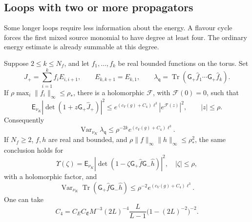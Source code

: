\documentclass[11pt,letterpaper,reqno]{amsart}
\makeatletter
\theoremstyle{definition}
\newcommand{\ms@majorstart}{%
  \pushQED{\qed}\renewcommand{\qedsymbol}{$\blacksquare\square$}}
\newenvironment{theorem}[1][]{\ms@majorstart\ms@theorem[#1]}
  {\popQED\endms@theorem}
\theoremstyle{remark}
\makeatother
\begin{document}
\subsection{Loops with two or more propagators}

Some longer loops require less information about the energy.
A flavour cycle forces the first mixed source monomial to have
degree at least four.  The ordinary energy estimate is already
summable at this degree.

\begin{theorem}\label{C-415-3}
Suppose $2\le k\le N_f$, and let $f_1,\ldots,f_k$ be real bounded
functions on the torus.  Set
\[
 J_+=\sum_{i=1}^k f_iE_{i,i+1},\qquad E_{k,k+1}=E_{k,1},
 \qquad
 \lambda_{\mathsf q}=\operatorname{Tr}
       (\mathsf G_+\hat f_1\cdots\mathsf G_+\hat f_k).
\]
If $\rho\max_i\|f_i\|_\infty\le\rho_*$, there is a holomorphic
$\mathcal F$, with $\mathcal F(0)=0$, such that
\[
 \mathsf E_{\nu_K}|\det(1+z\mathsf G_+\hat J_+)|^2
 \le e^{(c_V(g)+C_4)\ell^3}|e^{\mathcal F(z)}|^2,
 \qquad |z|\le\rho.
\]
Consequently
\[
 \operatorname{Var}_{\nu_K}\lambda_{\mathsf q}
       \le\rho^{-2k}e^{(c_V(g)+C_4)\ell^3}.
\]
If $N_f\ge2$, $f,h$ are real and bounded, and
$\rho\|f\|_\infty\|h\|_\infty\le\rho_*^2$, the same conclusion
holds for
\[
 \Upsilon(\zeta)=\mathsf E_{\nu_K}
 |\det(1-\zeta\mathsf G_+\hat f\mathsf G_-\hat h)|^2,
 \quad |\zeta|\le\rho,
\]
with a holomorphic factor, and
\[
 \operatorname{Var}_{\nu_K}\operatorname{Tr}
       (\mathsf G_+\hat f\mathsf G_-\hat h)
       \le\rho^{-2}e^{(c_V(g)+C_4)\ell^3}.
\]
One can take
\[
 C_4=C_EC_{\mathfrak E}M^{-3}(2L)^{-4}
       \frac L{L-1}\bigl(1-(2L)^{-2}\bigr)^{-2}.
\]
\end{theorem}
\end{document}
